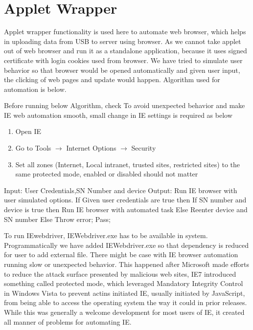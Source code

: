 \documentclass[12pt]{report}
\begin{document}
\section*{Applet Wrapper}
Applet wrapper functionality is used here to automate web browser, which helps in uploading data from USB to server using browser. As we cannot take applet out of web browser and run it as a standalone application, because it uses signed certificate with login cookies used from browser. We have tried to simulate user behavior so that browser would be opened automatically and given user input, the clicking of web pages and update would happen. Algorithm used for automation is below.

Before running below Algorithm, check
To avoid unexpected behavior and make IE web automation smooth, small change in IE settings is required as below
\begin{enumerate} [label=(\alph*)]
\item Open IE
\item Go to Tools $\rightarrow$ {Internet Options} $\rightarrow$ {Security}
\item Set all zones (Internet, Local intranet, trusted sites, restricted sites) to the same protected mode, enabled or disabled should not matter
\end{enumerate}

Input: User Credentials,SN Number and device
Output: Run IE browser with user simulated options.
	If Given user credentials are true then
		If SN number and device is true then
				Run IE browser with automated task
		Else
			Reenter device and SN number
	Else
		Throw error;
	Pass;


To run IEwebdriver, IEWebdriver.exe has to be available in system. Programmatically we have added IEWebdriver.exe so that dependency is reduced for user to add external file.
There might be case with IE browser automation running slow or unexpected behavior. This happened after Microsoft made efforts to reduce the attack surface presented by malicious web sites, IE7 introduced something called protected mode, which leveraged Mandatory Integrity Control in Windows Vista to prevent actins initiated IE, usually initiated by JavaScript, from being able to access the operating system the way it could in prior releases. While this was generally a welcome development for most users of IE, it created all manner of problems for automating IE.
\end{document}
